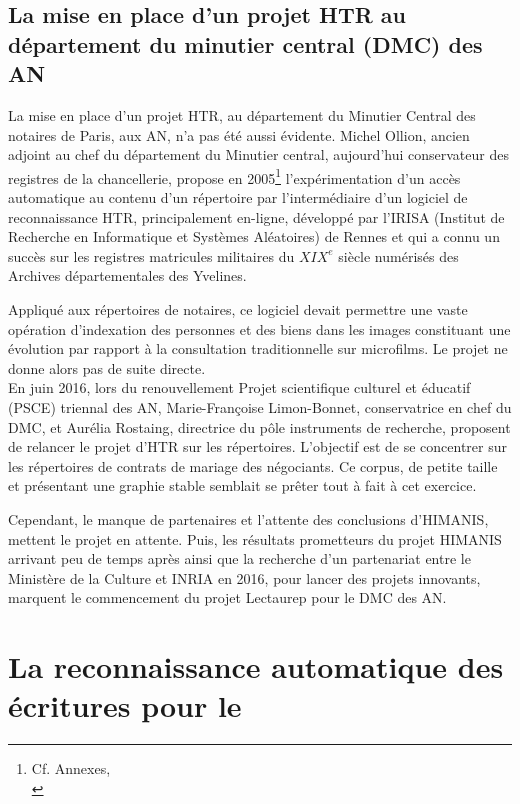 \subsection{La mise en place d'un projet HTR au département du minutier central (DMC) des AN}

La mise en place d'un projet HTR, au département du Minutier Central des notaires de Paris, aux AN, n'a pas été aussi évidente. Michel Ollion, ancien adjoint au chef du département du Minutier central, aujourd'hui conservateur des registres de la chancellerie, propose en 2005\footnote{Cf. Annexes,\\ } l'expérimentation d'un accès automatique au contenu d'un répertoire par l'intermédiaire d'un logiciel de reconnaissance HTR, principalement en-ligne, développé par l'IRISA (Institut de Recherche en Informatique et Systèmes Aléatoires) de Rennes et qui a connu un succès sur les registres matricules militaires du $XIX^{e}$ siècle numérisés des Archives départementales des Yvelines.

Appliqué aux répertoires de notaires, ce logiciel devait permettre une vaste opération d'indexation des personnes et des biens dans les images constituant une évolution par rapport à la consultation traditionnelle sur microfilms. Le projet ne donne alors pas de suite directe.\\

En juin 2016, lors du renouvellement Projet scientifique culturel et éducatif (PSCE) triennal des AN, Marie-Françoise Limon-Bonnet, conservatrice en chef du DMC, et Aurélia Rostaing, directrice du pôle instruments de recherche, proposent de relancer le projet d'HTR sur les répertoires. L'objectif est de se concentrer sur les répertoires de contrats de mariage des négociants. Ce corpus, de petite taille et présentant une graphie stable semblait se prêter tout à fait à cet exercice. 

Cependant, le manque de partenaires et l'attente des conclusions d'HIMANIS, mettent le projet en attente. Puis, les résultats prometteurs du projet HIMANIS arrivant peu de temps après ainsi que la recherche d'un partenariat entre le Ministère de la Culture et INRIA en 2016, pour lancer des projets innovants, marquent le commencement du projet Lectaurep pour le DMC des AN.
\newpage

\section{La reconnaissance automatique des écritures pour le }

